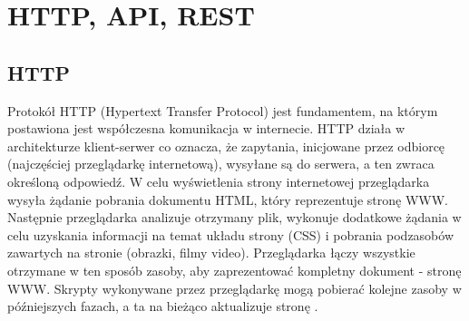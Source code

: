 \chapter{HTTP, API, REST}
\section{HTTP}
	Protokół HTTP (Hypertext Transfer Protocol) jest fundamentem, na którym postawiona jest współczesna komunikacja w internecie. HTTP działa w architekturze klient-serwer co oznacza, że zapytania, inicjowane przez odbiorcę (najczęściej przeglądarkę internetową), wysyłane są do serwera, a ten zwraca określoną odpowiedź. W celu wyświetlenia strony internetowej przeglądarka wysyła żądanie pobrania dokumentu HTML, który reprezentuje stronę WWW. Następnie przeglądarka analizuje otrzymany plik, wykonuje dodatkowe żądania w celu uzyskania informacji na temat układu strony (CSS) i pobrania podzasobów zawartych na stronie (obrazki, filmy video). Przeglądarka łączy wszystkie otrzymane w ten sposób zasoby, aby zaprezentować kompletny dokument - stronę WWW. Skrypty wykonywane przez przeglądarkę mogą pobierać kolejne zasoby w późniejszych fazach, a ta na bieżąco aktualizuje stronę \cite{MozillaHTTP}.

